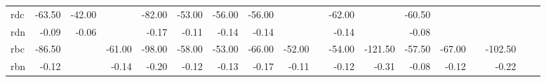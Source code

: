 \begin{table}[htbp]
{\begin{tabular}{lrrrrrrrrrrrrrrrrr}
rdc & -63.50 & -42.00 &  & -82.00 & -53.00 & -56.00 & -56.00 &  &  & -62.00 &  & -60.50 &  &  &  &  &  \\
rdn & -0.09 & -0.06 &  & -0.17 & -0.11 & -0.14 & -0.14 &  &  & -0.14 &  & -0.08 &  &  &  &  &  \\
rbc & -86.50 &  & -61.00 & -98.00 & -58.00 & -53.00 & -66.00 & -52.00 &  & -54.00 & -121.50 & -57.50 & -67.00 &  & -102.50 &  &  \\
rbn & -0.12 &  & -0.14 & -0.20 & -0.12 & -0.13 & -0.17 & -0.11 &  & -0.12 & -0.31 & -0.08 & -0.12 &  & -0.22 &  &  \\

\end{tabular}
}
\end{table}
